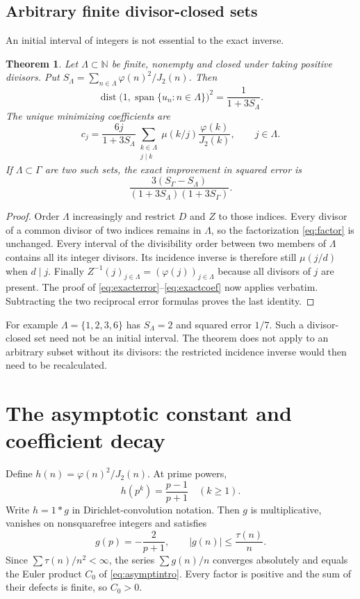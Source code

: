 \documentclass[11pt]{amsart}
\newtheorem{theorem}{Theorem}[section]
\theoremstyle{definition}
\newcommand{\N}{\mathbb N}\newcommand{\Q}{\mathbb Q}\newcommand{\C}{\mathbb C}\newcommand{\R}{\mathbb R}
\newcommand{\dist}{\operatorname{dist}}\newcommand{\Span}{\operatorname{span}}
\begin{document}
\subsection{Arbitrary finite divisor-closed sets}
An initial interval of integers is not essential to the exact inverse.
\begin{theorem}\label{thm:divisorclosed}
Let $\Lambda\subset\N$ be finite, nonempty and closed under taking
positive divisors. Put
$S_\Lambda=\sum_{n\in\Lambda}\varphi(n)^2/J_2(n)$. Then
\[
 \dist\bigl(1,\Span\{u_n:n\in\Lambda\}\bigr)^2
   =\frac1{1+3S_\Lambda}.
\]
The unique minimizing coefficients are
\[
 c_j=\frac{6j}{1+3S_\Lambda}
       \sum_{\substack{k\in\Lambda\\j\mid k}}
           \mu(k/j)\frac{\varphi(k)}{J_2(k)},\qquad j\in\Lambda.
\]
If $\Lambda\subset\Gamma$ are two such sets, the exact improvement
in squared error is
\[
 \frac{3(S_\Gamma-S_\Lambda)}
 {(1+3S_\Lambda)(1+3S_\Gamma)}.
\]
\end{theorem}
\begin{proof}
Order $\Lambda$ increasingly and restrict $D$ and $Z$ to those
indices. Every divisor of a common divisor of two indices remains
in $\Lambda$, so the factorization \eqref{eq:factor} is unchanged.
Every interval of the divisibility order between two members of
$\Lambda$ contains all its integer divisors. Its incidence inverse
is therefore still $\mu(j/d)$ when $d\mid j$. Finally
$Z^{-1}(j)_{j\in\Lambda}=(\varphi(j))_{j\in\Lambda}$ because all
divisors of $j$ are present. The proof of
\eqref{eq:exacterror}--\eqref{eq:exactcoef} now applies verbatim.
Subtracting the two reciprocal error formulas proves the last identity.
\end{proof}

For example $\Lambda=\{1,2,3,6\}$ has $S_\Lambda=2$ and squared
error $1/7$. Such a divisor-closed set need not be an initial interval.
The theorem does not apply to an arbitrary subset without its
divisors: the restricted incidence inverse would then need to be
recalculated.

\section{The asymptotic constant and coefficient decay}
Define $h(n)=\varphi(n)^2/J_2(n)$. At prime powers,
\[
 h(p^k)=\frac{p-1}{p+1}\quad(k\ge1).
\]
Write $h=1*g$ in Dirichlet-convolution notation. Then $g$ is
multiplicative, vanishes on nonsquarefree integers and satisfies
\[
 g(p)=-\frac2{p+1},\qquad |g(n)|\le\frac{\tau(n)}n.
\]
Since $\sum\tau(n)/n^2<\infty$, the series $\sum g(n)/n$ converges
absolutely and equals the Euler product $C_0$ of
\eqref{eq:asymptintro}. Every factor is positive and the sum of their
defects is finite, so $C_0>0$.
\end{document}
